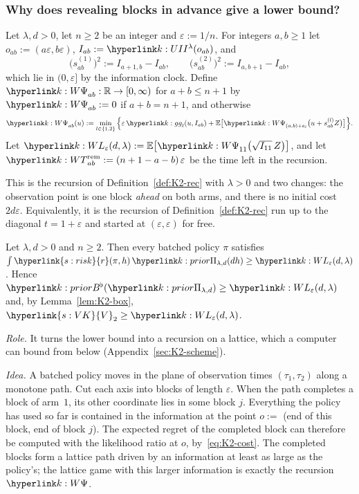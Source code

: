 \documentclass[11pt]{article}
\newcommand{\dt}[1]{\hypertarget{#1}{}}
\DeclareRobustCommand{\sy}[2]{{\hyperlink{#1}{#2}}}
\newcommand{\R}{\mathbb{R}}
\newcommand{\E}{\mathbb{E}}
\newcommand{\1}{\mathbf{1}}
\newcommand{\rk}{\sy{s:risk}{r}}
\newcommand{\VK}{\sy{s:VK}{V}}
\begin{document}
\subsubsection{Why does revealing blocks in advance give a lower bound?}

\begin{definition}\label{def:K2-W}\dt{k:W}
Let $\lambda,d>0$, let $n\ge2$ be an integer and $\varepsilon:=1/n$. For integers $a,b\ge1$ let $o_{ab}:=(a\varepsilon,b\varepsilon)$, $I_{ab}:=\kI(o_{ab})$, and
\[
\big(s^{(1)}_{ab}\big)^2:=I_{a+1,b}-I_{ab},\qquad \big(s^{(2)}_{ab}\big)^2:=I_{a,b+1}-I_{ab},
\]
which lie in $(0,\varepsilon]$ by the information clock. Define $\kW_{ab}:\R\to[0,\infty)$ for $a+b\le n+1$ by $\kW_{ab}:=0$ if $a+b=n+1$, and otherwise
\[
\kW_{ab}(u):=\min_{l\in\{1,2\}}\Big\{\varepsilon\,\kg_l(u,I_{ab})+\E\big[\kW_{(a,b)+e_l}\big(u+s^{(l)}_{ab}Z\big)\big]\Big\}.
\]
Let $\kL(d,\lambda):=\E\big[\kW_{11}\big(\sqrt{I_{11}}\,Z\big)\big]$, and let $\kT_{ab}:=(n+1-a-b)\,\varepsilon$ be the time left in the recursion.
\end{definition}

\noindent This is the recursion of Definition~\ref{def:K2-rec} with $\lambda>0$ and two changes: the observation point is one block \emph{ahead} on both arms, and
there is no initial cost $2d\varepsilon$. Equivalently, it is the recursion of Definition~\ref{def:K2-rec} run up to the diagonal $t=1+\varepsilon$ and started at
$(\varepsilon,\varepsilon)$ for free.

\begin{proposition}\label{prop:K2-relax}
Let $\lambda,d>0$ and $n\ge2$. Then every batched policy $\pi$ satisfies $\int\rk(\pi,h)\,\kPri(dh)\ge\kL(d,\lambda)$. Hence $\kBb(\kPri)\ge\kL(d,\lambda)$ and, by
Lemma~\ref{lem:K2-box}, $\VK_2\ge\kL(d,\lambda)$.
\end{proposition}
\noindent\textit{Role.} It turns the lower bound into a recursion on a lattice, which a computer can bound from below (Appendix~\ref{sec:K2-scheme}).

\noindent\textit{Idea.} A batched policy moves in the plane of observation times $(\tau_1,\tau_2)$ along a monotone path. Cut each axis into blocks of length
$\varepsilon$. When the path completes a block of arm~$1$, its other coordinate lies in some block $j$. Everything the policy has used so far is contained in the
information at the point $o:=$ (end of this block, end of block $j$). The expected regret of the completed block can therefore be computed with the
likelihood ratio at $o$, by~\eqref{eq:K2-cost}. The completed blocks form a lattice path driven by an information at least as large as the policy's; the lattice
game with this larger information is exactly the recursion $\kW$.
\end{document}
